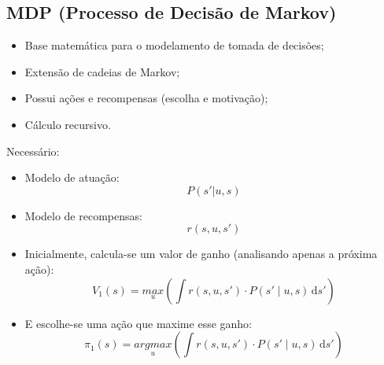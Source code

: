 \documentclass{beamer}
\begin{document}

\subsection{MDP (Processo de Decisão de Markov)}

\begin{frame}

\begin{itemize}
	\item Base matemática para o modelamento de tomada de decisões;\pause
	\item Extensão de cadeias de Markov;\pause
	\item Possui ações e recompensas (escolha e motivação);\pause
	\item Cálculo recursivo.
\end{itemize}
\end{frame}


\begin{frame}
Necessário:
\begin{itemize}
	\item Modelo de atuação: $$ P \left(s' | u, s \right) $$\pause
	\item Modelo de recompensas: $$ r \left( s, u, s' \right) $$
\end{itemize}
\end{frame}


\begin{frame}

\begin{itemize}
	\item Inicialmente, calcula-se um valor de ganho (analisando apenas a próxima ação): $$ V_1 \left( s \right) = \underset{u}{max} \left( \int \! r \left( s, u, s' \right) \cdot P \left( s' \mid u, s \right) \, \mathrm{d}s' \right) $$\pause
	\item E escolhe-se uma ação que maxime esse ganho: $$ \pi_1 \left( s \right) = \underset{u}{argmax} \left( \int \! r \left( s, u, s' \right) \cdot P \left( s' \mid u, s \right) \, \mathrm{d}s' \right) $$
\end{itemize}
\end{frame}

\end{document}
